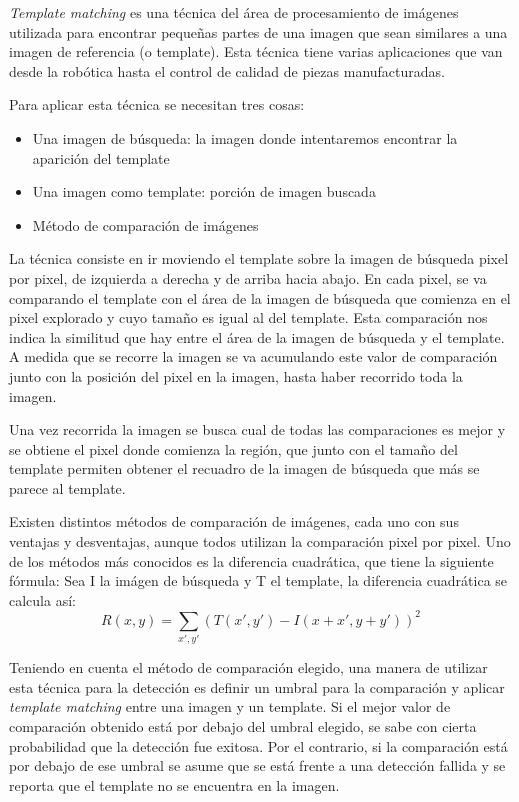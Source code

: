 \textit{Template matching} es una técnica del área de procesamiento de imágenes utilizada para encontrar pequeñas partes de una imagen que sean similares a una imagen de referencia (o template). Esta técnica tiene varias aplicaciones que van desde la robótica hasta el control de calidad de piezas manufacturadas.

Para aplicar esta técnica se necesitan tres cosas:
\begin{itemize}
	\item Una imagen de búsqueda: la imagen donde intentaremos encontrar la aparición del template
	\item Una imagen como template: porción de imagen buscada
	\item Método de comparación de imágenes
\end{itemize}

La técnica consiste en ir moviendo el template sobre la imagen de búsqueda pixel por pixel, de izquierda a derecha y de arriba hacia abajo. En cada pixel, se va comparando el template con el área de la imagen de búsqueda que comienza en el pixel explorado y cuyo tamaño es igual al del template. Esta comparación nos indica la similitud que hay entre el área de la imagen de búsqueda y el template. A medida que se recorre la imagen se va acumulando este valor de comparación junto con la posición del pixel en la imagen, hasta haber recorrido toda la imagen.

Una vez recorrida la imagen se busca cual de todas las comparaciones es mejor y se obtiene el pixel donde comienza la región, que junto con el tamaño del template permiten obtener el recuadro de la imagen de búsqueda que más se parece al template.

Existen distintos métodos de comparación de imágenes, cada uno con sus ventajas y desventajas, aunque todos utilizan la comparación pixel por pixel. Uno de los métodos más conocidos es la diferencia cuadrática, que tiene la siguiente fórmula: Sea I la imágen de búsqueda y T el template, la diferencia cuadrática se calcula así:
\begin{equation}
R(x, y) = \displaystyle\sum\limits_{x', y'} (T(x', y') - I(x + x', y + y'))^2
\end{equation}

Teniendo en cuenta el método de comparación elegido, una manera de utilizar esta técnica para la detección es definir un umbral para la comparación y aplicar \textit{template matching} entre una imagen y un template. Si el mejor valor de comparación obtenido está por debajo del umbral elegido, se sabe con cierta probabilidad que la detección fue exitosa. Por el contrario, si la comparación está por debajo de ese umbral se asume que se está frente a una detección fallida y se reporta que el template no se encuentra en la imagen.


